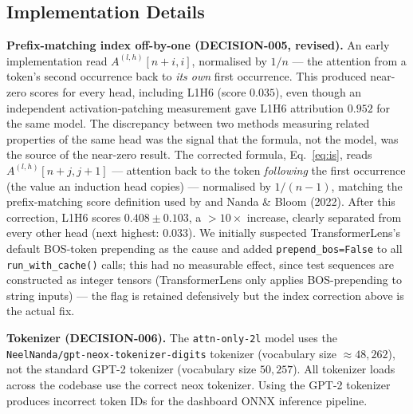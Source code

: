 \subsection{Implementation Details}
\label{sec:implementation}

\textbf{Prefix-matching index off-by-one (DECISION-005, revised).}
An early implementation read $A^{(l,h)}[n+i, i]$, normalised by $1/n$ ---
the attention from a token's second occurrence back to \emph{its own} first
occurrence. This produced near-zero scores for every head, including L1H6
(score $0.035$), even though an independent activation-patching measurement
gave L1H6 attribution $0.952$ for the same model. The discrepancy between
two methods measuring related properties of the same head was the signal
that the formula, not the model, was the source of the near-zero result.
The corrected formula, Eq.~\ref{eq:is}, reads $A^{(l,h)}[n+j, j+1]$ ---
attention back to the token \emph{following} the first occurrence (the
value an induction head copies) --- normalised by $1/(n-1)$, matching the
prefix-matching score definition used by \citet{olsson2022context} and
Nanda \& Bloom (2022). After this correction, L1H6 scores $0.408 \pm 0.103$,
a $>10\times$ increase, clearly separated from every other head (next
highest: $0.033$). We initially suspected TransformerLens's default
BOS-token prepending as the cause and added \texttt{prepend\_bos=False} to
all \texttt{run\_with\_cache()} calls; this had no measurable effect, since
test sequences are constructed as integer tensors (TransformerLens only
applies BOS-prepending to string inputs) --- the flag is retained
defensively but the index correction above is the actual fix.

\textbf{Tokenizer (DECISION-006).}
The \texttt{attn-only-2l} model uses the \texttt{NeelNanda/gpt-neox-tokenizer-digits}
tokenizer (vocabulary size $\approx 48{,}262$), not the standard GPT-2 tokenizer
(vocabulary size $50{,}257$).
All tokenizer loads across the codebase use the correct neox tokenizer.
Using the GPT-2 tokenizer produces incorrect token IDs for the dashboard
ONNX inference pipeline.

